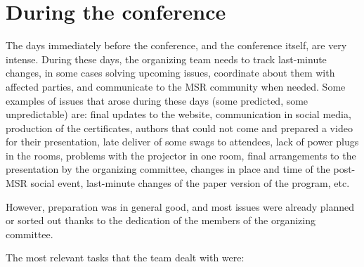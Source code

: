 \documentclass[a4paper]{report}
\begin{document}
\section{During the conference}

The days immediately before the conference, and the conference itself, are very intense. During these days, the organizing team needs to track last-minute changes, in some cases solving upcoming issues, coordinate about them with affected parties, and communicate to the MSR community when needed. Some examples of issues that arose during these days (some predicted, some unpredictable) are: final updates to the website, communication in social media, production of the certificates, authors that could not come and prepared a video for their presentation, late deliver of some swags to attendees, lack of power plugs in the rooms, problems with the projector in one room, final arrangements to the presentation by the organizing committee, changes in place and time of the post-MSR social event, last-minute changes of the paper version of the program, etc.

However, preparation was in general good, and most issues were already planned or sorted out thanks to the dedication of the members of the organizing committee.

The most relevant tasks that the team dealt with were:
\end{document}
